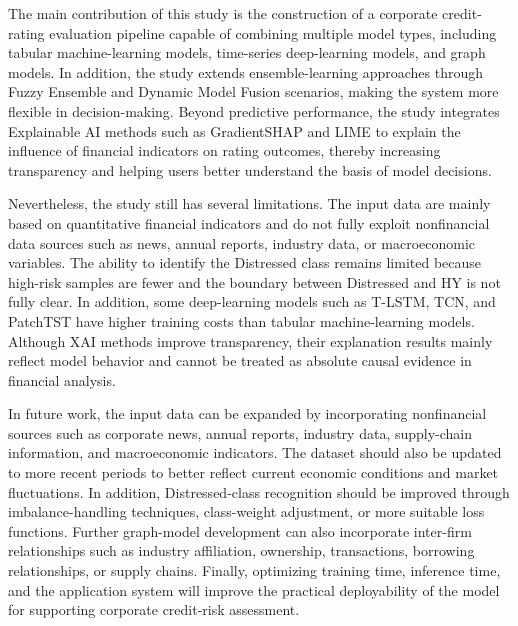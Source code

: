 \documentclass[10pt,twoside]{article}
\begin{document}
The main contribution of this study is the construction of a corporate credit-rating evaluation pipeline capable of combining multiple model types, including tabular machine-learning models, time-series deep-learning models, and graph models. In addition, the study extends ensemble-learning approaches through Fuzzy Ensemble and Dynamic Model Fusion scenarios, making the system more flexible in decision-making. Beyond predictive performance, the study integrates Explainable AI methods such as GradientSHAP and LIME to explain the influence of financial indicators on rating outcomes, thereby increasing transparency and helping users better understand the basis of model decisions.

Nevertheless, the study still has several limitations. The input data are mainly based on quantitative financial indicators and do not fully exploit nonfinancial data sources such as news, annual reports, industry data, or macroeconomic variables. The ability to identify the Distressed class remains limited because high-risk samples are fewer and the boundary between Distressed and HY is not fully clear. In addition, some deep-learning models such as T-LSTM, TCN, and PatchTST have higher training costs than tabular machine-learning models. Although XAI methods improve transparency, their explanation results mainly reflect model behavior and cannot be treated as absolute causal evidence in financial analysis.

In future work, the input data can be expanded by incorporating nonfinancial sources such as corporate news, annual reports, industry data, supply-chain information, and macroeconomic indicators. The dataset should also be updated to more recent periods to better reflect current economic conditions and market fluctuations. In addition, Distressed-class recognition should be improved through imbalance-handling techniques, class-weight adjustment, or more suitable loss functions. Further graph-model development can also incorporate inter-firm relationships such as industry affiliation, ownership, transactions, borrowing relationships, or supply chains. Finally, optimizing training time, inference time, and the application system will improve the practical deployability of the model for supporting corporate credit-risk assessment.



\end{document}
